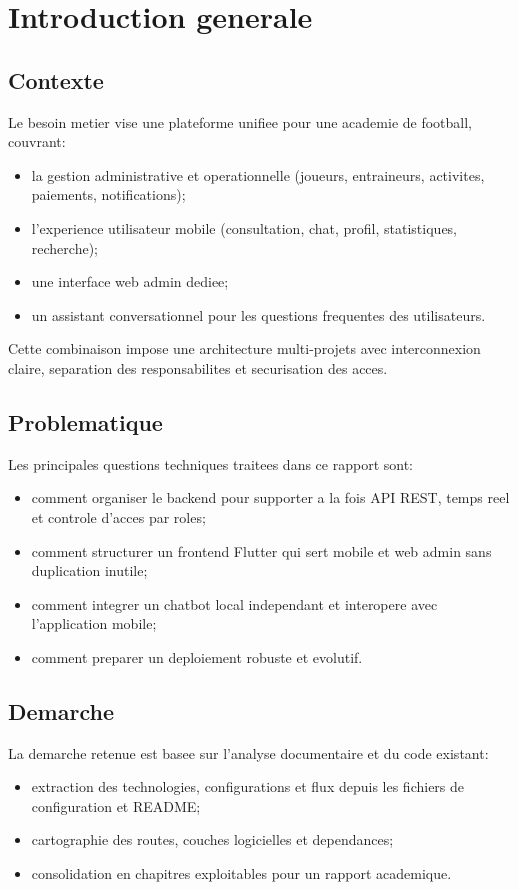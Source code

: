 \chapter{Introduction generale}

\section{Contexte}

Le besoin metier vise une plateforme unifiee pour une academie de football, couvrant:
\begin{itemize}[leftmargin=*]
  \item la gestion administrative et operationnelle (joueurs, entraineurs, activites, paiements, notifications);
  \item l'experience utilisateur mobile (consultation, chat, profil, statistiques, recherche);
  \item une interface web admin dediee;
  \item un assistant conversationnel pour les questions frequentes des utilisateurs.
\end{itemize}

Cette combinaison impose une architecture multi-projets avec interconnexion claire, separation des responsabilites et securisation des acces.

\section{Problematique}

Les principales questions techniques traitees dans ce rapport sont:
\begin{itemize}[leftmargin=*]
  \item comment organiser le backend pour supporter a la fois API REST, temps reel et controle d'acces par roles;
  \item comment structurer un frontend Flutter qui sert mobile et web admin sans duplication inutile;
  \item comment integrer un chatbot local independant et interopere avec l'application mobile;
  \item comment preparer un deploiement robuste et evolutif.
\end{itemize}

\section{Demarche}

La demarche retenue est basee sur l'analyse documentaire et du code existant:
\begin{itemize}[leftmargin=*]
  \item extraction des technologies, configurations et flux depuis les fichiers de configuration et README;
  \item cartographie des routes, couches logicielles et dependances;
  \item consolidation en chapitres exploitables pour un rapport academique.
\end{itemize}

